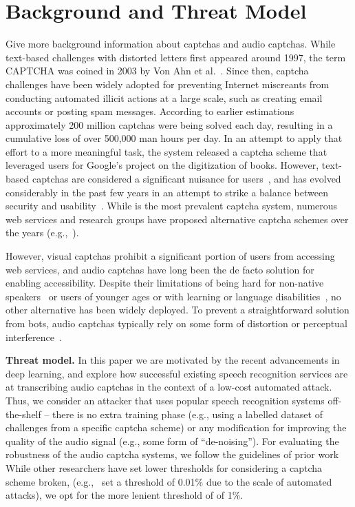 \section{Background and Threat Model}
\label{sec:background}

Give more background information about captchas and audio captchas.
While text-based challenges with distorted letters first appeared around 1997,
the term CAPTCHA was coined in 2003 by Von Ahn et al.~\cite{captcha}. Since 
then, captcha challenges have been widely adopted for preventing Internet 
miscreants from conducting automated illicit actions at a large scale, such as 
creating email accounts or posting spam messages. According to earlier estimations~\cite{captcha_stats}
approximately 200 million captchas were being solved each day, resulting in a
cumulative loss of over 500,000 man hours per day. In an attempt to apply that 
effort to a more meaningful task, the \re system released a captcha scheme that
leveraged users for Google's project on the digitization of books. However, 
text-based captchas are considered a significant nuisance for users~\cite{scientific_american},
and \re has evolved considerably in the past few years in an attempt to strike 
a balance between security and usability~\cite{recaptcha}. While \re is the
most prevalent captcha system, numerous web services and research groups have 
proposed alternative captcha schemes over the years (e.g.,~\cite{Chew04,asirra,dcaptcha}).

However, visual captchas prohibit a significant portion of users from accessing 
web services, and audio captchas have long been the de facto solution for
enabling accessibility. Despite their limitations of being hard for
non-native speakers~\cite{yan2008usability} or users of younger ages 
or with learning or language disabilities~\cite{schlaikjer2007dual},
no other alternative has been widely deployed.
To prevent a straightforward solution from bots, audio captchas 
typically rely on some form of distortion or perceptual interference~\cite{shinn2008object}.

\textbf{Threat model.} In this paper we are motivated by the recent advancements 
in deep learning, and explore how successful existing speech recognition services
are at transcribing audio captchas in the context of a low-cost automated attack. 
Thus, we consider an attacker that uses popular speech recognition systems off-the-shelf --
there is no extra training phase (e.g., using a labelled dataset of challenges from 
a specific captcha scheme) or any modification for improving the quality of the audio 
signal (e.g., some form of ``de-noising''). For evaluating the robustness of the 
audio captcha systems, we follow the guidelines of prior work~\cite{bursztein2011failure}
While other researchers have set lower thresholds for considering a captcha scheme 
broken, (e.g.,~\cite{Chellapilla} set a threshold of 0.01\% due to the scale of 
automated attacks), we opt for the more lenient threshold of of 1\%.
